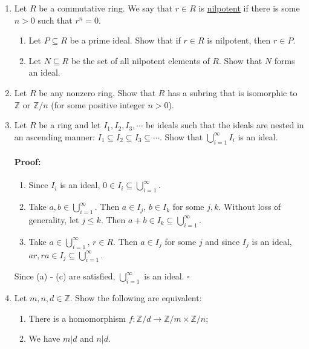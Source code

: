 \documentclass [12pt] {article}
\newcommand{\Z}{\mathbb{Z}}
\newenvironment{proof}{\paragraph{Proof:}}{\hfill$\square$}
\begin{document}
\begin{enumerate}
    \item Let $R$ be a commutative ring. We say that $r\in R$ is \underline{nilpotent} if there is some $n>0$ such that $r^n=0$. 
        \begin{enumerate}
            \item Let $P\subseteq R$ be a prime ideal. Show that if $r\in R$ is nilpotent, then $r\in P$. 

            \item Let $N\subseteq R$ be the set of all nilpotent elements of $R$. Show that $N$ forms an ideal. 
        \end{enumerate}

    \item Let $R$ be any nonzero ring. Show that $R$ has a subring that is isomorphic to $\Z$ or $\Z/n$ (for some positive integer $n>0$).

    \item Let $R$ be a ring and let $I_1,I_2,I_3,\cdots $ be ideals such that the ideals are nested in an ascending manner: $I_1\subseteq I_2\subseteq I_3\subseteq\cdots$.
        Show that $\bigcup\limits_{i=1}^\infty I_i$ is an ideal. 

        \begin{proof}
            \begin{enumerate}
                \item Since $I_i$ is an ideal, $0 \in I_i \subseteq \bigcup^{\infty}_{i = 1}$.
                \item Take $a, b \in \bigcup^{\infty}_{i = 1}$. Then $a \in I_j$, $b \in I_k$ for 
                    some $j, k$. Without loss of generality, let $j \leq k$. Then 
                    $a + b \in I_k \subseteq \bigcup^{\infty}_{i = 1}$.
                \item Take $a \in \bigcup^{\infty}_{i = 1}$, $r \in R$. Then $a \in I_j$ for some
                    $j$ and since $I_j$ is an ideal, 
                    $ar, ra \in I_j \subseteq \bigcup^{\infty}_{i = 1}$.
            \end{enumerate}
            Since (a) - (c) are satisfied, $\bigcup^{\infty}_{i = 1}$ is an ideal.
        \end{proof}

    \item Let $m,n,d\in \Z$. Show the following are equivalent: 
        \begin{enumerate}
            \item There is a homomorphism $f:\Z/d\to \Z/m\times \Z/n$;
            \item We have $m|d$ and $n|d$.
        \end{enumerate}


\end{enumerate}
\end{document}
